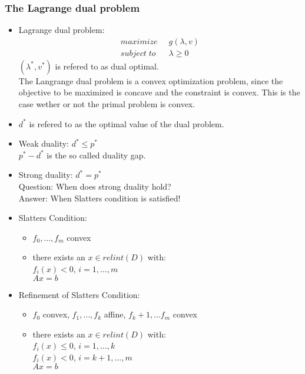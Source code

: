 \documentclass{scrartcl}
\begin{document}
\subsubsection{The Lagrange dual problem}
\begin{itemize}
    \item
        Lagrange dual problem:
        \begin{align*}
            maximize \;\; & g(\lambda, v)\\
            subject \; to \; \; & \lambda \geq 0
        \end{align*}
        $(\lambda^*, v^*)$ is refered to as dual optimal.\\
        The Langrange dual problem is a convex optimization problem, since the objective to be maximized is concave and the constraint is convex. This is the case wether or not the primal problem is convex.
    \item
        $d^*$ is refered to as the optimal value of the dual problem. 
    \item     
        Weak duality: $d^* \leq p^*$\\
        $p^* - d^*$ is the so called duality gap.
    \item
        Strong duality: $d^* = p^*$\\
        Question: When does strong duality hold?\\
        Answer: When Slatters condition is satisfied!
    \item
        Slatters Condition:
        \begin{itemize}
            \item
                $f_0,\dots,f_m$ convex
            \item
                there exists an $x \in relint(D)$ with:\\
                $f_i(x) < 0$, $i=1,\dots,m$\\
                $Ax = b$
        \end{itemize}
    \item
        Refinement of Slatters Condition:
        \begin{itemize}
            \item
                $f_0$ convex, $f_1, \dots, f_k$ affine, $f_k+1, \dots f_m$ convex
            \item
                there exists an $x \in relint(D)$ with:\\
                $f_i(x) \leq 0$, $i=1,\dots, k$\\
                $f_i(x) < 0$, $i=k+1, \dots, m$\\
                $Ax = b$
                
        \end{itemize}
\end{itemize}
\end{document}
